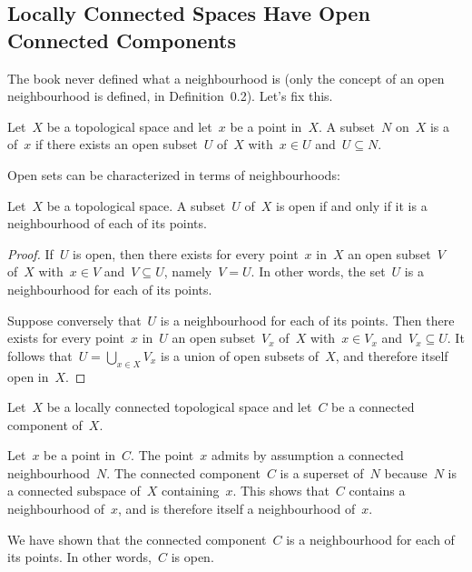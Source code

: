 \subsection{Locally Connected Spaces Have Open Connected Components}

The book never defined what a neighbourhood is (only the concept of an open neighbourhood is defined, in Definition~0.2).
Let’s fix this.

\begin{definition}
	Let~$X$ be a topological space and let~$x$ be a point in~$X$.
	A subset~$N$ on~$X$ is a  of~$x$ if there exists an open subset~$U$ of~$X$ with~$x ∈ U$ and~$U ⊆ N$.
\end{definition}

Open sets can be characterized in terms of neighbourhoods:

\begin{proposition}
	Let~$X$ be a topological space.
	A subset~$U$ of~$X$ is open if and only if it is a neighbourhood of each of its points.
\end{proposition}

\begin{proof}
	If~$U$ is open, then there exists for every point~$x$ in~$X$ an open subset~$V$ of~$X$ with~$x ∈ V$ and~$V ⊆ U$, namely~$V = U$.
	In other words, the set~$U$ is a neighbourhood for each of its points.

	Suppose conversely that~$U$ is a neighbourhood for each of its points.
	Then there exists for every point~$x$ in~$U$ an open subset~$V_x$ of~$X$ with~$x ∈ V_x$ and~$V_x ⊆ U$.
	It follows that~$U = ⋃_{x ∈ X} V_x$ is a union of open subsets of~$X$, and therefore itself open in~$X$.
\end{proof}

Let~$X$ be a locally connected topological space and let~$C$ be a connected component of~$X$.

Let~$x$ be a point in~$C$.
The point~$x$ admits by assumption a connected neighbourhood~$N$.
The connected component~$C$ is a superset of~$N$ because~$N$ is a connected subspace of~$X$ containing~$x$.
This shows that~$C$ contains a neighbourhood of~$x$, and is therefore itself a neighbourhood of~$x$.

We have shown that the connected component~$C$ is a neighbourhood for each of its points.
In other words,~$C$ is open.

